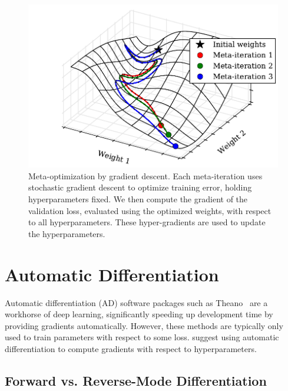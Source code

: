 \documentclass{article}
\begin{document}
\begin{figure}[ht]
\vskip 0.2in
\begin{center}
\includegraphics[width=\columnwidth]{../experiments/Jan_25_Figure_1/2/learning_curves.pdf}
\caption{Meta-optimization by gradient descent.
Each meta-iteration uses stochastic gradient descent to optimize training error, holding hyperparameters fixed.
We then compute the gradient of the validation loss, evaluated using the optimized weights, with respect to all hyperparameters.
These hyper-gradients are used to update the hyperparameters.}
\label{fig:chaos}
\end{center}
\vskip -0.2in
\end{figure} 

\section{Automatic Differentiation}

Automatic differentiation (AD) software packages such as Theano~\cite{Bastien-Theano-2012, bergstra2010scipy} are a workhorse of deep learning, significantly speeding up development time by providing gradients automatically.
However, these methods are typically only used to train parameters with respect to some loss.
\citet{Autodiff14} suggest using automatic differentiation to compute gradients with respect to hyperparameters.

\subsection{Forward vs. Reverse-Mode Differentiation}
\end{document}
